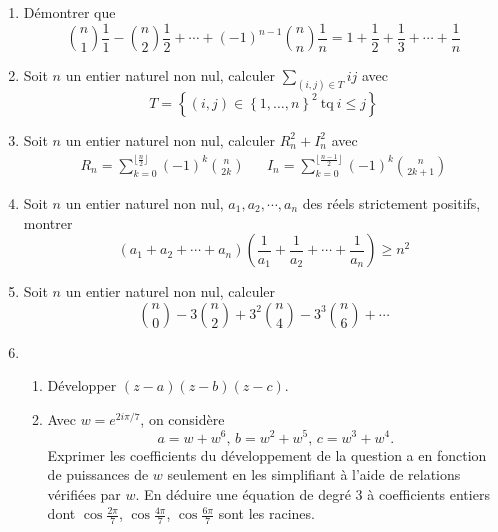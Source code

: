 \begin{enumerate}
\item D{\'e}montrer que 
 \begin{displaymath}
\binom{n}{1}\frac{1}{1}- \binom{n}{2}\frac{1}{2}+\cdots+(-1)^{n-1} \binom{n}{n}\frac{1}{n}=1+\frac{1}{2}+\frac{1}{3}+\cdots+\frac{1}{n} 
 \end{displaymath}

\item Soit $n$ un entier naturel non nul, calculer $\sum_{(i,j)\in T}ij$ avec 
\begin{displaymath}
 T=\left\{ (i,j)\in \left\{ 1,\ldots ,n\right\} ^{2} \  \mathrm{ tq } \ i\leq j\right\}
\end{displaymath}

\item Soit $n$ un entier naturel non nul, calculer $R_{n}^{2}+I_{n}^{2}$ avec
\begin{align*}
 R_{n}=\sum_{k=0}^{\lfloor \frac{n}{2}\rfloor} (-1)^{k}\binom{n}{2k} & & I_{n}=\sum_{k=0}^{\lfloor \frac{n-1}{2}\rfloor} (-1)^{k}\binom{n}{2k+1}
\end{align*}

\item Soit $n$ un entier naturel non nul, $a_{1},a_{2},\cdots ,a_{n}$ des r{\'e}els strictement positifs, montrer
\begin{displaymath}
(a_{1}+a_{2}+\cdots +a_{n})(\frac{1}{a_{1}}+\frac{1}{a_{2}}+\cdots +\frac{1}{a_{n}}) \geq n^{2} 
\end{displaymath}

\item Soit $n$ un entier naturel non nul, calculer
\begin{displaymath}
 \binom{n}{0}-3\binom{n}{2}+3^{2}\binom{n}{4}-3^{3}\binom{n}{6}+\cdots 
\end{displaymath}

\item 
  \begin{enumerate}
    \item D{\'e}velopper $(z-a)(z-b)(z-c)$.
    \item Avec $w=e^{2i\pi /7}$, on considère
\begin{displaymath}
 a = w+w^{6},\, b = w^{2}+w^{5},\, c = w^{3}+w^{4}.
\end{displaymath}
Exprimer les coefficients du développement de la question a en fonction de puissances de $w$ seulement en les simplifiant à l'aide de relations vérifiées par $w$.\newline
En déduire une {\'e}quation de degr{\'e} 3 à coefficients entiers dont $\cos \frac{2\pi}{7}$, $\cos \frac{4\pi}{7}$, $\cos \frac{6\pi}{7}$ sont les racines.
\end{enumerate}


\end{enumerate}
